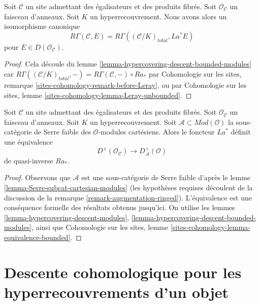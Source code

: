 \begin{lemma}
\label{lemma-compare-cohomology-hypercovering-modules}
Soit $\mathcal{C}$ un site admettant des égalisateurs et des produits fibrés.
Soit $\mathcal{O}_\mathcal{C}$ un faisceau d'anneaux.
Soit $K$ un hyperrecouvrement.
Nous avons alors un isomorphisme canonique
$$
R\Gamma(\mathcal{C}, E) =
R\Gamma((\mathcal{C}/K)_{total}, La^*E)
$$
pour $E \in D(\mathcal{O}_\mathcal{C})$.
\end{lemma}

\begin{proof}
Cela découle du lemme \ref{lemma-hypercovering-descent-bounded-modules}
car $R\Gamma((\mathcal{C}/K)_{total}, -) =
R\Gamma(\mathcal{C}, -) \circ Ra_*$ par
Cohomologie sur les sites, remarque \ref{sites-cohomology-remark-before-Leray},
ou par
Cohomologie sur les sites, lemme \ref{sites-cohomology-lemma-Leray-unbounded}.
\end{proof}

\begin{lemma}
\label{lemma-hypercovering-equivalence-bounded-modules}
Soit $\mathcal{C}$ un site admettant des égalisateurs et des produits fibrés.
Soit $\mathcal{O}_\mathcal{C}$ un faisceau d'anneaux.
Soit $K$ un hyperrecouvrement.
Soit $\mathcal{A} \subset \textit{Mod}(\mathcal{O})$
la sous-catégorie de Serre faible des $\mathcal{O}$-modules cartésiens.
Alors le foncteur $La^*$ définit une équivalence
$$
D^+(\mathcal{O}_\mathcal{C}) \longrightarrow D_\mathcal{A}^+(\mathcal{O})
$$
de quasi-inverse $Ra_*$.
\end{lemma}

\begin{proof}
Observons que $\mathcal{A}$ est une sous-catégorie de Serre faible d'après le
lemme \ref{lemma-Serre-subcat-cartesian-modules}
(les hypothèses requises découlent de la discussion de la
remarque \ref{remark-augmentation-ringed}).
L'équivalence est une conséquence formelle
des résultats obtenus jusqu'ici. On utilise les lemmes
\ref{lemma-hypercovering-descent-modules},
\ref{lemma-hypercovering-descent-bounded-modules}, ainsi que Cohomologie
sur les sites, lemme \ref{sites-cohomology-lemma-equivalence-bounded}.
\end{proof}






\section{Descente cohomologique pour les hyperrecouvrements d'un objet}
\label{section-cohomological-descent-hypercoverings-X}

